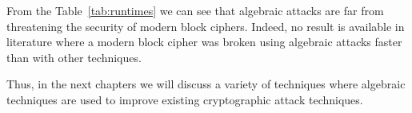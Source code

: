 From the Table~\ref{tab:runtimes} we can see that algebraic attacks are far from threatening the security of modern block ciphers. Indeed, no result is available in literature where a modern block cipher was broken using algebraic attacks faster than with other techniques.

Thus, in the next chapters we will discuss a variety of techniques where algebraic techniques are used to improve existing cryptographic attack techniques. 

